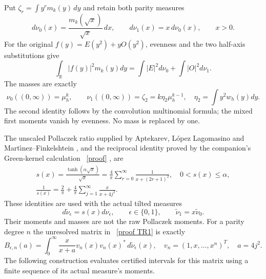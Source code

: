 \documentclass[11pt]{article}
\newcommand{\R}{\mathbb R}
\begin{document}
Put $\zeta_r=\int y^rm_k(y)\,dy$ and retain both parity measures
\begin{equation}\label{eq:parities}
 d\nu_0(x)=\frac{m_k(\sqrt x)}{\sqrt x}\,dx,\qquad
 d\nu_1(x)=x\,d\nu_0(x),\qquad x>0.
\end{equation}
For the original $f(y)=E(y^2)+yO(y^2)$, evenness and the two
half-axis substitutions give
\begin{equation}\label{eq:paritynorm}
 \int_\R|f(y)|^2m_k(y)dy
 =\int|E|^2d\nu_0+\int|O|^2d\nu_1.
\end{equation}
The masses are exactly
\[
 \nu_0((0,\infty))=\mu_h^k,\qquad
 \nu_1((0,\infty))=\zeta_2=k\eta_2\mu_h^{k-1},
 \quad\eta_2=\int y^2w_h(y)dy.
\]
The second identity follows by the convolution multinomial formula;
the mixed first moments vanish by evenness.  No mass is replaced by one.

The unscaled Pollaczek ratio supplied by Aptekarev, L\'opez Lagomasino
and Mart\'{\i}nez--Finkelshtein \cite{ALM}, and the reciprocal identity
proved by the companion's Green-kernel calculation \cite{PP}%
~\href{https://github.com/KokunoYumeto/zeta-function-research-reader/blob/5992ad50c0f2a06921f1fcaded7b4e38097c0739/workbenches/splitzero-tandem/continuations/20260920-original-kernel-mixed-determinants/providers/PARITY_POLLACZEK_NATIVE_RECEIVER.tex\#L1}{[proof]}%
{}, are
\begin{equation}\label{eq:s}
 \begin{gathered}
 s(x)=\frac{\tanh(\alpha\sqrt x)}{\sqrt x}
 =\frac4\pi\sum_{r=0}^\infty\frac1{x+(2r+1)^2},
 \quad0<s(x)\le\alpha,\\
 \frac1{s(x)}=\frac2\pi+\frac4\pi
       \sum_{j=1}^\infty\frac{x}{x+4j^2}.
 \end{gathered}
\end{equation}
These identities are used with the actual tilted measures
\begin{equation}\label{eq:tilts}
 d\widetilde\nu_\epsilon=s(x)d\nu_\epsilon,
 \qquad\epsilon\in\{0,1\},
 \qquad\widetilde\nu_1=x\widetilde\nu_0.
\end{equation}
Their moments and masses are not the raw Pollaczek moments.  For a
parity degree $n$ the unresolved matrix in \cite{TR}%
~\href{https://github.com/KokunoYumeto/zeta-function-research-reader/blob/5992ad50c0f2a06921f1fcaded7b4e38097c0739/workbenches/splitzero-tandem/continuations/20260920-original-kernel-mixed-determinants/providers/NATIVE_TRUNCATION_CONDUCTOR_RETURN.tex\#L54}{[proof TR1]}%
{} is exactly
\begin{equation}\label{eq:target}
 B_{\epsilon,n}(a)=\int_0^\infty
 \frac{x}{x+a}v_n(x)v_n(x)^*\,d\widetilde\nu_\epsilon(x),
 \quad v_n=(1,x,\ldots,x^n)^T,\quad a=4j^2.
\end{equation}
The following construction evaluates certified intervals for this
matrix using a finite sequence of its actual measure's moments.
\end{document}
